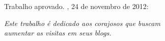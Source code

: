 \documentclass[
	12pt,				%
	openright,			%
	twoside,			%
	a4paper,			%
	english,			%
	french,				%
	spanish,			%
	brazil				%
	]{abntex2}
\begin{document}

%
% 
%
\begin{folhadeaprovacao}

  \begin{center}
    {\ABNTEXchapterfont\large\imprimirautor}

    \vspace*{\fill}\vspace*{\fill}
    \begin{center}
      \ABNTEXchapterfont\bfseries\Large\imprimirtitulo
    \end{center}
    \vspace*{\fill}
    
    \hspace{.45\textwidth}
    \begin{minipage}{.5\textwidth}
        \imprimirpreambulo
    \end{minipage}%
    \vspace*{\fill}
   \end{center}
        
   Trabalho aprovado. \imprimirlocal, 24 de novembro de 2012:

      
   \begin{center}
    \vspace*{0.5cm}
    {\large\imprimirlocal}
    \par
    {\large\imprimirdata}
    \vspace*{1cm}
  \end{center}
  
\end{folhadeaprovacao}

\begin{dedicatoria}
   \vspace*{\fill}
   \centering
   \noindent
   \textit{ Este trabalho é dedicado aos corajosos que buscam\\ aumentar as visitas em seus blogs.} \vspace*{\fill}
\end{dedicatoria}
\end{document}
